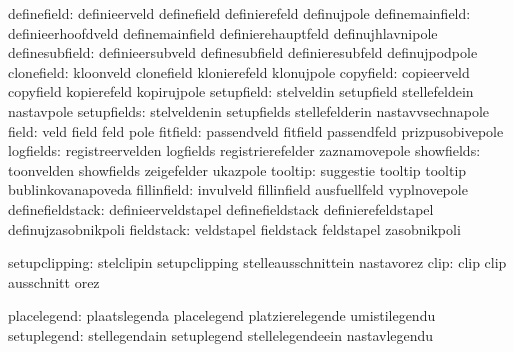                   definefield:  definieerveld                definefield
                                definierefeld                definujpole
              definemainfield:  definieerhoofdveld           definemainfield
                                definierehauptfeld           definujhlavnipole
               definesubfield:  definieersubveld             definesubfield
                                definieresubfeld             definujpodpole
                   clonefield:  kloonveld                    clonefield
                                klonierefeld                 klonujpole
                    copyfield:  copieerveld                  copyfield
                                kopierefeld                  kopirujpole
                   setupfield:  stelveldin                   setupfield
                                stellefeldein                nastavpole
                  setupfields:  stelveldenin                 setupfields
                                stellefelderin               nastavvsechnapole
                        field:  veld                         field
                                feld                         pole
                     fitfield:  passendveld                  fitfield
                                passendfeld                  prizpusobivepole %
                    logfields:  registreervelden             logfields
                                registrierefelder            zaznamovepole
                   showfields:  toonvelden                   showfields
                                zeigefelder                  ukazpole
                      tooltip:  suggestie                    tooltip
                                tooltip                      bublinkovanapoveda
                  fillinfield:  invulveld                    fillinfield
                                ausfuellfeld                 vyplnovepole
             definefieldstack:  definieerveldstapel          definefieldstack
                                definierefeldstapel          definujzasobnikpoli
                   fieldstack:  veldstapel                   fieldstack
                                feldstapel                   zasobnikpoli

                setupclipping:  stelclipin                   setupclipping
                                stelleausschnittein          nastavorez
                         clip:  clip                         clip
                                ausschnitt                   orez

                  placelegend:  plaatslegenda                placelegend
                                platzierelegende             umistilegendu
                  setuplegend:  stellegendain                setuplegend
                                stellelegendeein             nastavlegendu

